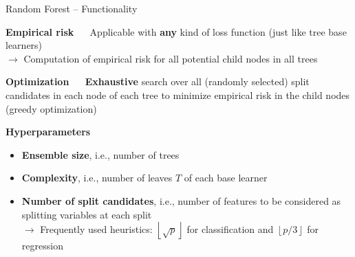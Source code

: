 \documentclass[11pt,compress,t,notes=noshow, xcolor=table]{beamer}
\newcommand{\highlight}[1]{\textcolor{highlightcol}{\textbf{#1}}}
\begin{document}
\begin{frame}{Random Forest -- Functionality}

\footnotesize

\highlight{Empirical risk} ~~
Applicable with \textbf{any} kind of loss function (just like tree base 
learners) \\
$\rightarrow$ Computation of empirical risk for all potential child nodes in all 
trees

\medskip

\highlight{Optimization} ~~ \textbf{Exhaustive} search over
all (randomly selected) split candidates in each node of each tree to minimize
empirical risk in the child nodes (greedy optimization) \\

\medskip

\highlight{Hyperparameters}

\begin{itemize}
  \item \textbf{Ensemble size}, i.e., number of trees
  \item \textbf{Complexity}, i.e., number of leaves $T$ of each base learner
  \item \textbf{Number of split candidates}, i.e., number of features to be
  considered as splitting variables at each split \\
  $\rightarrow$ Frequently used heuristics: 
  $\left \lfloor{\sqrt{p}}\right \rfloor$ for classification and
  $\left \lfloor{p/3}\right \rfloor$ for regression
\end{itemize}
  
\end{frame}


\end{document}
